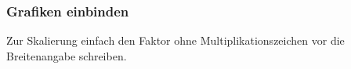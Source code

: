 \begin{frame}[containsverbatim=true]
\frametitle{Grafiken einbinden}
Zur Skalierung einfach den Faktor ohne Multiplikationszeichen vor die
Breitenangabe schreiben.
\begin{figure}
\end{figure}
\end{frame}